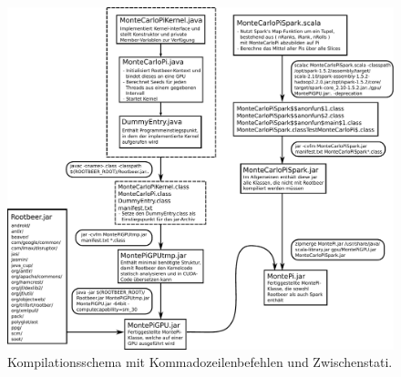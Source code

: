 \documentclass[german,bibnum,beleg,zihtitle,german,hyperref,utf8]{zihpub}
\begin{document}
%


\begin{figure}[H]
	\centering
	\begin{minipage}{\linewidth}
		\includegraphics[width=\linewidth]{compile-structure-deu.pdf}
	\end{minipage}
	\caption{Kompilationsschema mit Kommadozeilenbefehlen und Zwischenstati.}
	\label{fig:compilation}
\end{figure}
\end{document}
